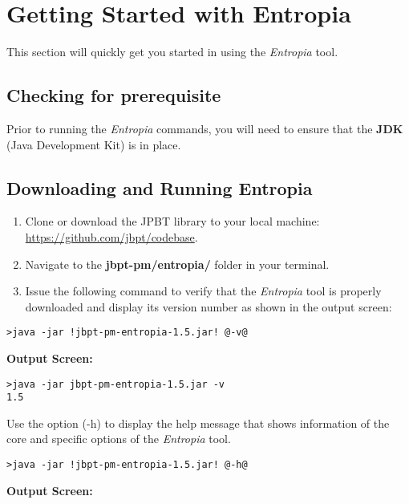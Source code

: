 \section*{Getting Started with Entropia}
\label{sec:start}
This section will quickly get you started in using the \textit{Entropia} tool.

\subsection{Checking for prerequisite}
Prior to running the \textit{Entropia} commands, you will need to ensure that the \textbf{JDK} (Java Development Kit) is in place.
\subsection{Downloading and Running Entropia}

\begin{enumerate}
\itemsep0em 
\item Clone or download the JPBT library to your local machine: \url{https://github.com/jbpt/codebase}.
\item Navigate to the \textbf{jbpt-pm\slash entropia\slash } folder in your terminal.
\item Issue the following command to verify that the \textit{Entropia} tool is properly downloaded and display its version number as shown in the output screen:
\end{enumerate}
\begin{lstlisting}[style=CL]
>java -jar !jbpt-pm-entropia-1.5.jar! @-v@
\end{lstlisting}
\textbf{Output Screen:}
\begin{lstlisting}[style=DOS]
>java -jar jbpt-pm-entropia-1.5.jar -v
1.5
\end{lstlisting}
\smallbreak
Use the option (\textcolor{darkcandyapplered}{\footnotesize\ttfamily-h}) to display the help message that shows information of the core and specific options of the \textit{Entropia} tool.
\begin{lstlisting}[style=CL]
>java -jar !jbpt-pm-entropia-1.5.jar! @-h@
\end{lstlisting}
\textbf{Output Screen:}%

